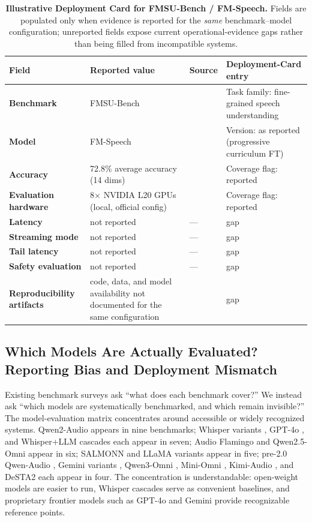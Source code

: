 \begin{table}[!ht]
\centering
\caption{\textbf{Illustrative Deployment Card for FMSU-Bench /
FM-Speech.} Fields are populated only when evidence is reported for
the \emph{same} benchmark--model configuration; unreported fields
expose current operational-evidence gaps rather than being filled from
incompatible systems.}
\label{tab:joint_metric_pilot}
\scriptsize
\setlength{\tabcolsep}{4pt}
\renewcommand{\arraystretch}{1.25}
\begin{tabularx}{\columnwidth}{@{}>{\bfseries}l X l X@{}}
\toprule
Field & Reported value & Source & Deployment-Card entry \\
\midrule
Benchmark &
FMSU-Bench &
\citep{li2026fmsubench} &
Task family: fine-grained speech understanding \\
Model &
FM-Speech &
\citep{li2026fmsubench} &
Version: as reported (progressive curriculum FT) \\
Accuracy &
72.8\% average accuracy (14 dims) &
\citep{li2026fmsubench} &
Coverage flag: reported \\
Evaluation hardware &
8$\times$ NVIDIA L20 GPUs (local, official config) &
\citep{li2026fmsubench} &
Coverage flag: reported \\
Latency &
not reported &
--- &
gap \\
Streaming mode &
not reported &
--- &
gap \\
Tail latency &
not reported &
--- &
gap \\
Safety evaluation &
not reported &
--- &
gap \\
Reproducibility artifacts &
code, data, and model availability not documented for the same
configuration &
\citep{li2026fmsubench} &
gap \\
\bottomrule
\end{tabularx}
\end{table}

\subsection{Which Models Are Actually Evaluated? Reporting Bias and Deployment Mismatch}
\label{subsec:eval_models}

Existing benchmark surveys ask ``what does each benchmark cover?'' We
instead ask ``which models are systematically benchmarked, and which
remain invisible?'' The model-evaluation matrix concentrates around
accessible or widely recognized systems. Qwen2-Audio \citep{team2024qwen2}
appears in nine benchmarks; Whisper variants \citep{radford2023robust},
GPT-4o \citep{openai2024gpt4o}, and Whisper+LLM cascades each appear in
seven; Audio Flamingo \citep{kong2024audioflamingo} and Qwen2.5-Omni
\citep{xu2025qwen25omni} appear in six; SALMONN \citep{tang2023salmonn} and
LLaMA variants \citep{touvron2023llama} appear in five; pre-2.0 Qwen-Audio
\citep{bai2023qwen}, Gemini variants \citep{google2024gemini}, Qwen3-Omni
\citep{xu2026qwen3omni}, Mini-Omni \citep{xie2024miniomni}, Kimi-Audio
\citep{du2025kimiaudio}, and DeSTA2 \citep{lu2026desta2} each appear in
four. The concentration
is understandable: open-weight models are easier to run, Whisper cascades
serve as convenient baselines, and proprietary frontier models such as
GPT-4o and Gemini provide recognizable reference points.

